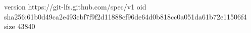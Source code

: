 version https://git-lfs.github.com/spec/v1
oid sha256:61b0d49ca2e493cbf7f9f2d11888cf96de64d0b818cc0a051da61b72e11506f4
size 43840
